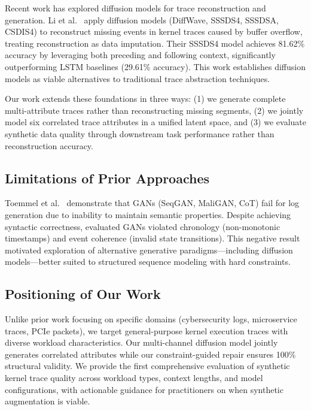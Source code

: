 Recent work has explored diffusion models for trace reconstruction and generation. Li et al.~\cite{11029922} apply diffusion models (DiffWave, SSSDS4, SSSDSA, CSDIS4) to reconstruct missing events in kernel traces caused by buffer overflow, treating reconstruction as data imputation. Their SSSDS4 model achieves 81.62\% accuracy by leveraging both preceding and following context, significantly outperforming LSTM baselines (29.61\% accuracy). This work establishes diffusion models as viable alternatives to traditional trace abstraction techniques.

Our work extends these foundations in three ways: (1) we generate complete multi-attribute traces rather than reconstructing missing segments, (2) we jointly model six correlated trace attributes in a unified latent space, and (3) we evaluate synthetic data quality through downstream task performance rather than reconstruction accuracy.

\subsection{Limitations of Prior Approaches}

Toemmel et al.~\cite{toemmel2021catchganusingartificial} demonstrate that GANs (SeqGAN, MaliGAN, CoT) fail for log generation due to inability to maintain semantic properties. Despite achieving syntactic correctness, evaluated GANs violated chronology (non-monotonic timestamps) and event coherence (invalid state transitions). This negative result motivated exploration of alternative generative paradigms—including diffusion models—better suited to structured sequence modeling with hard constraints.

\subsection{Positioning of Our Work}

Unlike prior work focusing on specific domains (cybersecurity logs, microservice traces, PCIe packets), we target general-purpose kernel execution traces with diverse workload characteristics. Our multi-channel diffusion model jointly generates correlated attributes while our constraint-guided repair ensures 100\% structural validity. We provide the first comprehensive evaluation of synthetic kernel trace quality across workload types, context lengths, and model configurations, with actionable guidance for practitioners on when synthetic augmentation is viable.
